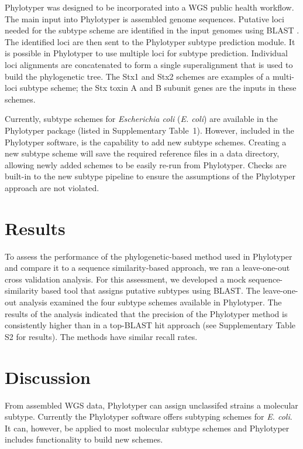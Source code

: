 \documentclass{bioinfo}
\begin{document}
Phylotyper was designed to be incorporated into a WGS public health workflow.  
The main input into Phylotyper is assembled genome sequences.  
Putative loci needed for the subtype scheme are identified in the input genomes using BLAST \citep{Camacho2009}.
The identified loci are then sent to the Phylotyper subtype prediction module.
It is possible in Phylotyper to use multiple loci for subtype prediction.
Individual loci alignments are concatenated to form a single superalignment that is used to build the phylogenetic tree.  
The Stx1 and Stx2 schemes are examples of a multi-loci subtype scheme; the Stx toxin A and B subunit genes are the inputs in these schemes.

Currently, subtype schemes for \emph{Escherichia coli} (\textit{E. coli}) are available in the Phylotyper package (listed in Supplementary Table~1).
However, included in the Phylotyper software, is the capability to add new subtype schemes. 
Creating a new subtype scheme will save the required reference files in a data directory, allowing newly added schemes to be easily re-run from Phylotyper.
Checks are built-in to the new subtype pipeline to ensure the assumptions of the Phylotyper approach are not violated.  

\section{Results}

To assess the performance of the phylogenetic-based method used in Phylotyper and compare it to a sequence similarity-based approach, we ran a leave-one-out cross validation analysis.
For this assessment, we developed a mock sequence-similarity based tool that assigns putative subtypes using BLAST.
The leave-one-out analysis examined the four subtype schemes available in Phylotyper. The results of the analysis indicated that the precision of the Phylotyper method is consistently higher than in a top-BLAST hit approach (see Supplementary Table S2 for results). The methods have similar recall rates.

\section{Discussion}

From assembled WGS data, Phylotyper can assign unclassifed strains a molecular subtype.
Currently the Phylotyper software offers subtyping schemes for \textit{E. coli}.
It can, however, be applied to most molecular subtype schemes and Phylotyper includes functionality to build new schemes.
\end{document}
